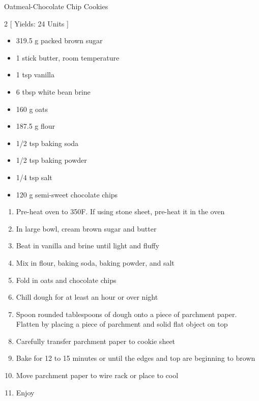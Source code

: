\begin{Large}
    Oatmeal-Chocolate Chip Cookies
\end{Large}

\begin{scriptsize}
\begin{multicols}{2}
[
\vspace{1em}
Yields: 24 Units
\vspace{-1.5em}
]

\begin{itemize}
    \item 319.5 g packed brown sugar 
    \item 1 stick butter, room temperature
    \item 1 tsp vanilla
    \item 6 tbsp white bean brine
    \item 160 g oats
    \item 187.5 g flour
    \item 1/2 tsp baking soda
    \item 1/2 tsp baking powder
    \item 1/4 tsp salt
    \item 120 g semi-sweet chocolate chips
\end{itemize}
\end{multicols}
\end{scriptsize}

\begin{footnotesize}
\begin{enumerate}
    \item Pre-heat oven to 350\degree F. If using stone sheet, pre-heat it in the oven
    \item In large bowl, cream brown sugar and butter
    \item Beat in vanilla and brine until light and fluffy
    \item Mix in flour, baking soda, baking powder, and salt
    \item Fold in oats and chocolate chips
    \item Chill dough for at least an hour or over night
    \item Spoon rounded tablespoons of dough onto a piece of parchment paper. Flatten by placing a piece of parchment and solid flat object on top 
    \item Carefully transfer parchment paper to cookie sheet
    \item Bake for 12 to 15 minutes or until the edges and top are beginning to brown
    \item Move parchment paper to wire rack or place to cool
    \item Enjoy

\end{enumerate}
\end{footnotesize}

\vspace{2em}
